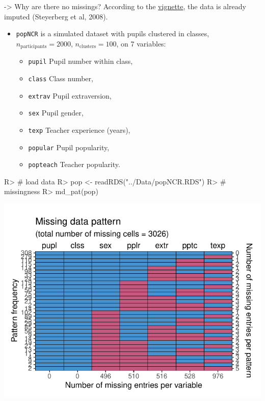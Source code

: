 \documentclass[
]{jss}
\providecommand{\tightlist}{%
  \setlength{\itemsep}{0pt}\setlength{\parskip}{0pt}}
\begin{document}
-\textgreater{} Why are there no missings? According to the
\href{https://cran.r-project.org/web/packages/metamisc/metamisc.pdf}{vignette},
the data is already imputed (Steyerberg et al, 2008).

\begin{itemize}
\tightlist
\item
  \texttt{popNCR} is a simulated dataset with pupils clustered in
  classes, \(n_{\text{participants}} = 2000\),
  \(n_{\text{clusters}} = 100\), on 7 variables:

  \begin{itemize}
  \tightlist
  \item
    \texttt{pupil} Pupil number within class,
  \item
    \texttt{class} Class number,
  \item
    \texttt{extrav} Pupil extraversion,
  \item
    \texttt{sex} Pupil gender,
  \item
    \texttt{texp} Teacher experience (years),
  \item
    \texttt{popular} Pupil popularity,
  \item
    \texttt{popteach} Teacher popularity.
  \end{itemize}
\end{itemize}

\begin{CodeChunk}
\begin{CodeInput}
R> # load data
R> pop <- readRDS("../Data/popNCR.RDS")
R> # missingness
R> md_pat(pop)
\end{CodeInput}


\begin{center}\includegraphics{Manuscript_files/figure-latex/pop-1} \end{center}

\end{CodeChunk}
\end{document}
